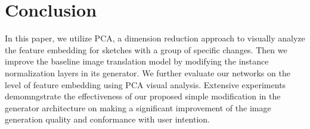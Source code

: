 \documentclass[10pt,twocolumn,letterpaper]{article}
\begin{document}
\section{Conclusion}
In this paper, we utilize PCA, a dimension reduction approach to visually analyze the feature embedding for sketches with a group of specific changes.  
Then we improve the baseline image translation model by modifying the instance normalization layers in its generator. 
We further evaluate our networks on the level of feature embedding using PCA visual analysis.
Extensive experiments demomngstrate the effectiveness of our proposed simple modification in the generator architecture on making a significant improvement of the image generation quality and conformance with user intention.  


%
%
%
%
\end{document}
